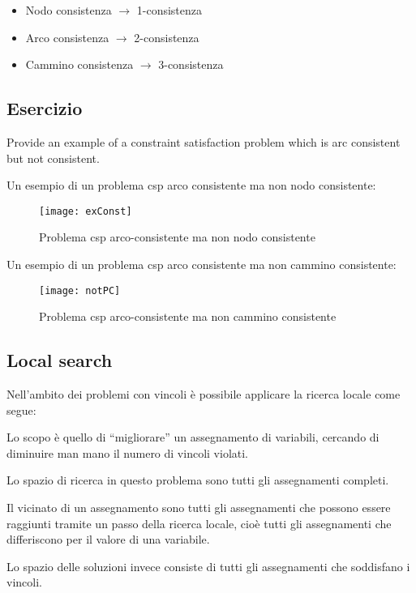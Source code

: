 \begin{itemize}
 \item Nodo consistenza $\rightarrow$ 1-consistenza
 \item Arco consistenza $\rightarrow$ 2-consistenza
 \item Cammino consistenza $\rightarrow$ 3-consistenza
\end{itemize}

\subsection{Esercizio}

Provide an example of a constraint satisfaction problem which is arc
consistent but not consistent.

Un esempio di un problema csp arco consistente ma non nodo consistente:

\begin{figure}[H]
\centering
\texttt{[image: exConst]}
\caption{Problema csp arco-consistente ma non nodo consistente}
\label{fig:fc}
\end{figure}

Un esempio di un problema csp arco consistente ma non cammino consistente:

\begin{figure}[H]
\centering
\texttt{[image: notPC]}
\caption{Problema csp arco-consistente ma non cammino consistente}
\label{fig:fc}
\end{figure}

\subsection{Local search}

Nell'ambito dei problemi con vincoli è possibile applicare la ricerca
locale come segue:

Lo scopo è quello di ``migliorare'' un assegnamento di variabili, cercando di
diminuire man mano il numero di vincoli violati.

Lo spazio di ricerca in questo problema sono tutti gli assegnamenti completi.

Il vicinato di un assegnamento sono tutti gli assegnamenti che possono essere
raggiunti tramite un passo della ricerca locale, cioè tutti gli assegnamenti
che differiscono per il valore di una variabile.

Lo spazio delle soluzioni invece consiste di tutti gli assegnamenti che
soddisfano i vincoli.

